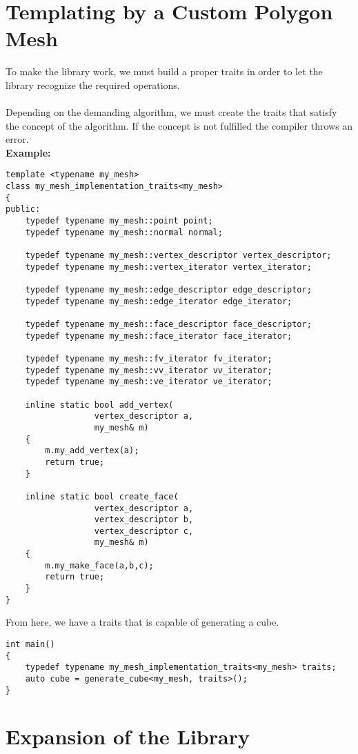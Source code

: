 \begin{appendices}
\chapter{Templating by a Custom Polygon Mesh}

To make the library work, we must build a proper traits in order to let the library recognize
the required operations.\\
\\
Depending on the demanding algorithm, we must create the traits that satisfy the concept
of the algorithm. If the concept is not fulfilled the compiler throws an error.\\

\textbf{Example:}

\begin{lstlisting}
template <typename my_mesh>
class my_mesh_implementation_traits<my_mesh>
{
public:
	typedef typename my_mesh::point point;
	typedef typename my_mesh::normal normal;

	typedef typename my_mesh::vertex_descriptor vertex_descriptor;
	typedef typename my_mesh::vertex_iterator vertex_iterator;

	typedef typename my_mesh::edge_descriptor edge_descriptor;
	typedef typename my_mesh::edge_iterator edge_iterator;

	typedef typename my_mesh::face_descriptor face_descriptor;
	typedef typename my_mesh::face_iterator face_iterator;

	typedef typename my_mesh::fv_iterator fv_iterator;
	typedef typename my_mesh::vv_iterator vv_iterator;
	typedef typename my_mesh::ve_iterator ve_iterator;
	
	inline static bool add_vertex(
				  vertex_descriptor a,
		  	  	  my_mesh& m)
	{
		m.my_add_vertex(a);
		return true;
	}		
	
	inline static bool create_face(
				  vertex_descriptor a,
				  vertex_descriptor b,
				  vertex_descriptor c,
		  	  	  my_mesh& m)
	{
		m.my_make_face(a,b,c);
		return true;
	}
}
\end{lstlisting}

From here, we have a traits that is capable of generating a cube.

\begin{lstlisting}
int main()
{
	typedef typename my_mesh_implementation_traits<my_mesh> traits;
	auto cube = generate_cube<my_mesh, traits>();
}
\end{lstlisting}

\chapter{Expansion of the Library}


\end{appendices}
